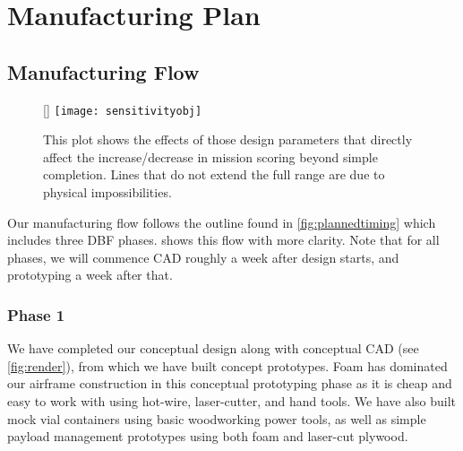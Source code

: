 
 \section{Manufacturing Plan} %
\label{sec:ManufacturingPlan}


\subsection{Manufacturing Flow}
\label{ssec:ManufacturingFlow}


\begin{wrapfigure}[10]{R}{0pt}
	\centering
	\raisebox{0pt}[\dimexpr{}\baselineskip\relax]{
		\texttt{[image: sensitivityobj]}
	}
	\caption{This plot shows the effects of those design parameters that directly affect the increase/decrease in mission scoring beyond simple completion. Lines that do not extend the full range are due to physical impossibilities.}
	\label{fig:sensitivity}
\end{wrapfigure}
Our manufacturing flow follows the outline found in \cref{fig:plannedtiming} which includes three DBF phases.   shows this flow with more clarity.  Note that for all phases, we will commence CAD roughly a week after design starts, and prototyping a week after that.

\subsubsection{Phase 1} We have completed our conceptual design along with conceptual CAD (see \cref{fig:render}), from which we have built concept prototypes. Foam has dominated our airframe construction in this conceptual prototyping phase as it is cheap and easy to work with using hot-wire, laser-cutter, and hand tools.  We have also built mock vial containers using basic woodworking power tools, as well as simple payload management prototypes using both foam and laser-cut plywood.

